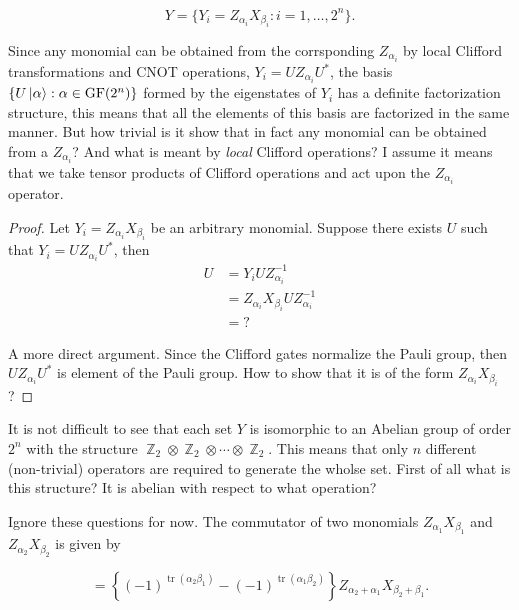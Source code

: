 \documentclass[a4paper,11pt]{report}
\DeclareMathOperator{\Z}{\mathbb{Z}}
\DeclareMathOperator{\tr}{tr}
\DeclareMathOperator{\GF}{GF}
\begin{document}
    \begin{equation}
        Y
        = \{Y_i = Z_{\alpha_i}X_{\beta_i} : i =
        1,\ldots,2^{n}\}.
    \end{equation}

    Since any monomial can be obtained from the corrsponding
    $Z_{\alpha_i}$ by local Clifford transformations and
    CNOT operations, $Y_i = U Z_{\alpha_i} U^{*}$, the basis
    $\{U\ket\alpha : \alpha \in \GF(2^{n})\}$ formed by the
    eigenstates of $Y_i$ has a definite factorization
    structure, this means that all the elements of this
    basis are factorized in the same manner. But how trivial
    is it show that in fact any monomial can be obtained
    from a $Z_{\alpha_i}$? And what is meant by
    \textit{local} Clifford operations? I assume it means
    that we take tensor products of Clifford operations and
    act upon the $Z_{\alpha_i}$ operator.

    \begin{proof}
        Let $Y_i = Z_{\alpha_i}X_{\beta_i}$ be an arbitrary
        monomial. Suppose there exists $U$ such that $Y_i =
        U Z_{\alpha_i} U^{*}$, then
        \begin{align*}
            U &= Y_i U Z_{\alpha_i}^{-1} \\
              &= Z_{\alpha_i} X_{\beta_i} U
              Z_{\alpha_i}^{-1} \\
              &= ?
        \end{align*}

        A more direct argument. Since the Clifford gates
        normalize the Pauli group, then $U Z_{\alpha_i}
        U^{*}$ is element of the Pauli group. How to show
        that it is of the form $Z_{\alpha_i} X_{\beta_i}$?
    \end{proof}

    It is not difficult to see that each set $Y$ is
    isomorphic to an Abelian group of order $2^{n}$ with the
    structure $\Z_2 \otimes \Z_2 \otimes \cdots \otimes
    \Z_2$. This means that only $n$ different (non-trivial)
    operators are required to generate the wholse set. First
    of all what is this structure? It is abelian with
    respect to what operation? 

    Ignore these questions for now. The commutator of two
    monomials $Z_{\alpha_1}X_{\beta_1}$ and
    $Z_{\alpha_2}X_{\beta_2}$ is given by

    \begin{equation}
        [
        Z_{\alpha_1}X_{\beta_1}, Z_{\alpha_2}X_{\beta_2}
        ]
        = \left\{
            (-1)^{\tr(\alpha_2\beta_1)}
            - (-1)^{\tr(\alpha_1\beta_2)}
        \right\} Z_{\alpha_2+\alpha_1} X_{\beta_2+\beta_1}.
    \end{equation}
\end{document}

